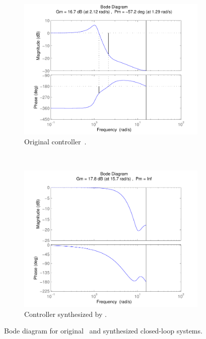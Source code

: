 \documentclass[final]{sig-alternate-05-2015}
\newcommand{\blue}[1]{{\color{blue}#1}}
\begin{document}
%
\begin{figure}[htb]
    \centering
    \begin{subfigure}[b]{0.4\textwidth}
        \includegraphics[width=\textwidth]{figures/runningexample_bd0.pdf}
        \caption{Original controller~\cite{DBLP:conf/hybrid/WangGRJF16}.}
        \label{fig:original}
    \end{subfigure}
    ~
    \begin{subfigure}[b]{0.4\textwidth}
        \includegraphics[width=\textwidth]{figures/runningexample_bd2.pdf}
        \caption{Controller synthesized by \tool.}
        \label{fig:cegiscontroller}
    \end{subfigure}
    \caption{Bode diagram for original~\cite{DBLP:conf/hybrid/WangGRJF16} and synthesized closed-loop systems.}\label{fig:bode}
\end{figure}
\end{document}
